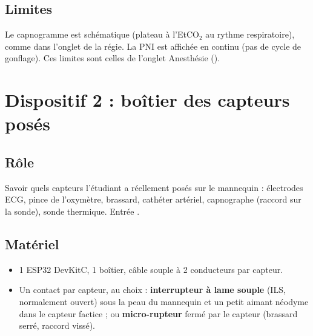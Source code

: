\documentclass[11pt,a4paper]{article}
\begin{document}
\subsection{Limites}
Le capnogramme est schématique (plateau à l'EtCO\(_2\) au rythme respiratoire), comme dans l'onglet de la régie. La PNI
est affichée en continu (pas de cycle de gonflage). Ces limites sont celles de l'onglet Anesthésie
().

\section{Dispositif 2 : boîtier des capteurs posés}
\subsection{Rôle}
Savoir quels capteurs l'étudiant a réellement posés sur le mannequin : électrodes ECG, pince de l'oxymètre, brassard,
cathéter artériel, capnographe (raccord sur la sonde), sonde thermique. Entrée .

\subsection{Matériel}
\begin{itemize}
  \item 1 ESP32 DevKitC, 1 boîtier, câble souple à 2 conducteurs par capteur.
  \item Un contact par capteur, au choix : \textbf{interrupteur à lame souple} (ILS, normalement ouvert) sous la peau
  du mannequin et un petit aimant néodyme dans le capteur factice ; ou \textbf{micro-rupteur} fermé par le capteur
  (brassard serré, raccord vissé).
\end{itemize}
\end{document}
